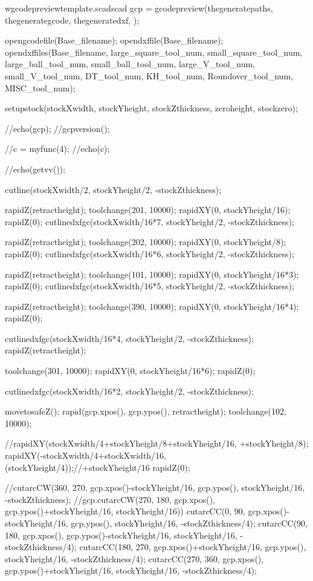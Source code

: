 \documentclass{ltxdoc}
\begin{document}
\begin{writecode}{w}{gcodepreviewtemplate.scad}{scad}
gcp = gcodepreview(thegeneratepaths, 
                   thegenerategcode, 
                   thegeneratedxf, 
                   );

opengcodefile(Base_filename);
opendxffile(Base_filename);
opendxffiles(Base_filename, 
                 large_square_tool_num, 
                 small_square_tool_num, 
                 large_ball_tool_num, 
                 small_ball_tool_num, 
                 large_V_tool_num, 
                 small_V_tool_num, 
                 DT_tool_num, 
                 KH_tool_num, 
                 Roundover_tool_num, 
                 MISC_tool_num);

setupstock(stockXwidth, stockYheight, stockZthickness, zeroheight, stockzero);

//echo(gcp);
//gcpversion();

//c = myfunc(4);
//echo(c);

//echo(getvv());

cutline(stockXwidth/2, stockYheight/2, -stockZthickness);

rapidZ(retractheight);
toolchange(201, 10000);
rapidXY(0, stockYheight/16);
rapidZ(0);
cutlinedxfgc(stockXwidth/16*7, stockYheight/2, -stockZthickness);


rapidZ(retractheight);
toolchange(202, 10000);
rapidXY(0, stockYheight/8);
rapidZ(0);
cutlinedxfgc(stockXwidth/16*6, stockYheight/2, -stockZthickness);

rapidZ(retractheight);
toolchange(101, 10000);
rapidXY(0, stockYheight/16*3);
rapidZ(0);
cutlinedxfgc(stockXwidth/16*5, stockYheight/2, -stockZthickness);

rapidZ(retractheight);
toolchange(390, 10000);
rapidXY(0, stockYheight/16*4);
rapidZ(0);

cutlinedxfgc(stockXwidth/16*4, stockYheight/2, -stockZthickness);
rapidZ(retractheight);

toolchange(301, 10000);
rapidXY(0, stockYheight/16*6);
rapidZ(0);

cutlinedxfgc(stockXwidth/16*2, stockYheight/2, -stockZthickness);


movetosafeZ();
rapid(gcp.xpos(), gcp.ypos(), retractheight);
toolchange(102, 10000);

//rapidXY(stockXwidth/4+stockYheight/8+stockYheight/16, +stockYheight/8);
rapidXY(-stockXwidth/4+stockXwidth/16, (stockYheight/4));//+stockYheight/16
rapidZ(0);

//cutarcCW(360, 270, gcp.xpos()-stockYheight/16, gcp.ypos(), stockYheight/16, -stockZthickness);
//gcp.cutarcCW(270, 180, gcp.xpos(), gcp.ypos()+stockYheight/16, stockYheight/16))
cutarcCC(0, 90, gcp.xpos()-stockYheight/16, gcp.ypos(), stockYheight/16, -stockZthickness/4);
cutarcCC(90, 180, gcp.xpos(), gcp.ypos()-stockYheight/16, stockYheight/16, -stockZthickness/4);
cutarcCC(180, 270, gcp.xpos()+stockYheight/16, gcp.ypos(), stockYheight/16, -stockZthickness/4);
cutarcCC(270, 360, gcp.xpos(), gcp.ypos()+stockYheight/16, stockYheight/16, -stockZthickness/4);


\end{writecode}
\end{document}
